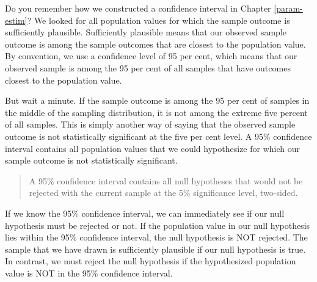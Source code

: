 \documentclass[a4paper]{book}
\newenvironment{Shaded}{\begin{snugshade}}{\end{snugshade}}
\newcommand{\KeywordTok}[1]{\textcolor[rgb]{0,0,0}{\textbf{#1}}}
\newcommand{\DecValTok}[1]{\textcolor[rgb]{0.00,0.00,0.00}{#1}}
\newcommand{\StringTok}[1]{\textcolor[rgb]{0.00,0.00,0.00}{#1}}
\newcommand{\ControlFlowTok}[1]{\textcolor[rgb]{0.00,0.00,0.00}{\textbf{#1}}}
\newcommand{\OperatorTok}[1]{\textcolor[rgb]{0.00,0.00,0.00}{\textbf{#1}}}
\newcommand{\NormalTok}[1]{#1}
\theoremstyle{definition}
\theoremstyle{definition}
\theoremstyle{definition}
\theoremstyle{remark}
\begin{document}
\begin{Shaded}
\end{Shaded}

Do you remember how we constructed a confidence interval in Chapter
\ref{param-estim}? We looked for all population values for which the
sample outcome is sufficiently plausible. Sufficiently plausible means
that our observed sample outcome is among the sample outcomes that are
closest to the population value. By convention, we use a confidence
level of 95 per cent, which means that our observed sample is among the
95 per cent of all samples that have outcomes closest to the population
value.

But wait a minute. If the sample outcome is among the 95 per cent of
samples in the middle of the sampling distribution, it is not among the
extreme five percent of all samples. This is simply another way of
saying that the observed sample outcome is not statistically significant
at the five per cent level. A 95\% confidence interval contains all
population values that we could hypothesize for which our sample outcome
is not statistically significant.

\begin{quote}
A 95\% confidence interval contains all null hypotheses that would not
be rejected with the current sample at the 5\% significance level,
two-sided.
\end{quote}

If we know the 95\% confidence interval, we can immediately see if our
null hypothesis must be rejected or not. If the population value in our
null hypothesis lies within the 95\% confidence interval, the null
hypothesis is NOT rejected. The sample that we have drawn is
sufficiently plausible if our null hypothesis is true. In contrast, we
must reject the null hypothesis if the hypothesized population value is
NOT in the 95\% confidence interval.
\end{document}
